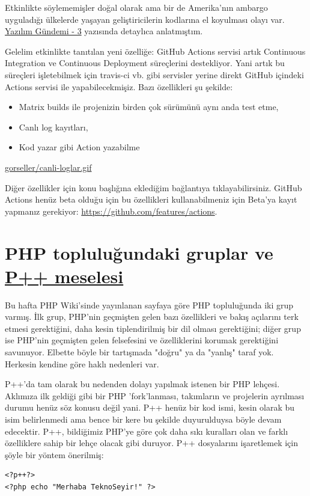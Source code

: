 \documentclass[11pt]{article}
\begin{document}
Etkinlikte söylememişler doğal olarak ama bir de Amerika'nın ambargo uyguladığı
ülkelerde yaşayan geliştiricilerin kodlarına el koyulması olayı var. \href{../03/yazilim-gundemi-03.pdf}{Yazılım
Gündemi - 3} yazısında detaylıca anlatmıştım.

Gelelim etkinlikte tanıtılan yeni özelliğe: GitHub Actions servisi artık
Continuous Integration ve Continuous Deployment süreçlerini destekliyor. Yani
artık bu süreçleri işletebilmek için travis-ci vb. gibi servisler yerine direkt
GitHub içindeki Actions servisi ile yapabilecekmişiz. Bazı özellikleri şu
şekilde:
\begin{itemize}
\item Matrix builds ile projenizin birden çok sürümünü aynı anda test etme,
\item Canlı log kayıtları,
\item Kod yazar gibi Action yazabilme
\end{itemize}

\url{gorseller/canli-loglar.gif}

Diğer özellikler için konu başlığına eklediğim bağlantıya tıklayabilirsiniz.
GitHub Actions henüz beta olduğu için bu özellikleri kullanabilmeniz için
Beta'ya kayıt yapmanız gerekiyor: \url{https://github.com/features/actions}.
\section{PHP topluluğundaki gruplar ve \href{https://wiki.php.net/pplusplus/faq}{P++ meselesi}}
\label{sec:org48578ec}
Bu hafta PHP Wiki'sinde yayınlanan sayfaya göre PHP topluluğunda iki grup
varmış. İlk grup, PHP'nin geçmişten gelen bazı özellikleri ve bakış açılarını
terk etmesi gerektiğini, daha kesin tiplendirilmiş bir dil olması gerektiğini;
diğer grup ise PHP'nin geçmişten gelen felsefesini ve özelliklerini korumak
gerektiğini savunuyor. Elbette böyle bir tartışmada "doğru" ya da "yanlış"
taraf yok. Herkesin kendine göre haklı nedenleri var.

P++'da tam olarak bu nedenden dolayı yapılmak istenen bir PHP lehçesi. Aklımıza
ilk geldiği gibi bir PHP 'fork'lanması, takımların ve projelerin ayrılması
durumu henüz söz konusu değil yani. P++ henüz bir kod ismi, kesin olarak bu
isim belirlenmedi ama bence bir kere bu şekilde duyurulduysa böyle devam
edecektir. P++, bildiğimiz PHP'ye göre çok daha sıkı kuralları olan ve farklı
özelliklere sahip bir lehçe olacak gibi duruyor. P++ dosyalarını işaretlemek
için şöyle bir yöntem önerilmiş:

\begin{verbatim}
<?p++?>
<?php echo "Merhaba TeknoSeyir!" ?>
\end{verbatim}
\end{document}
